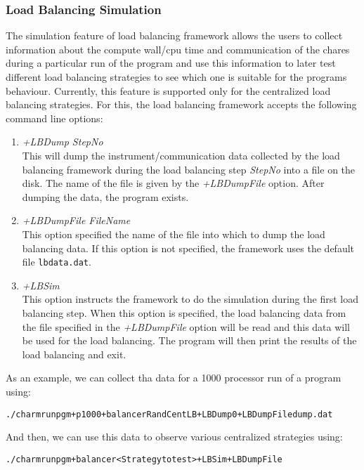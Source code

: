 \subsubsection{Load Balancing Simulation}
The simulation feature of load balancing framework allows the users to collect information
about the compute wall/cpu time and communication of the chares during a particular run of
the program and use this information to later test different load balancing strategies to
see which one is suitable for the programs behaviour. Currently, this feature is supported only for
the centralized load balancing strategies. For this, the load balancing framework
accepts the following command line options:
\begin{enumerate}
\item {\em +LBDump StepNo}\\
      This will dump the instrument/communication data collected by the load balancing framework
	  during the load balancing step {\em StepNo} into a file on the disk. The name of the file
	  is given by the {\em +LBDumpFile} option. After dumping the data, the program exists.
\item {\em +LBDumpFile FileName}\\
	This option specified the name of the file into which to dump the load balancing data. If this
	option is not specified, the framework uses the default file {\tt lbdata.dat}.
\item {\em +LBSim} \\
	This option instructs the framework to do the simulation during the first load balancing step.
	When this option is specified, the load balancing data from the file specified in the {\em +LBDumpFile}
	option will be read and this data will be used for the load balancing. The program will then print
	the results of the load balancing and exit.
\end{enumerate}
As an example, we can collect tha data for a 1000 processor run of a program using:
\begin{alltt}
./charmrun pgm +p 1000 +balancer RandCentLB +LBDump 0 +LBDumpFile dump.dat
\end{alltt}
And then, we can use this data to observe various centralized strategies using:
\begin{alltt}
./charmrun pgm +balancer <Strategy to test> +LBSim +LBDumpFile
\end{alltt}
